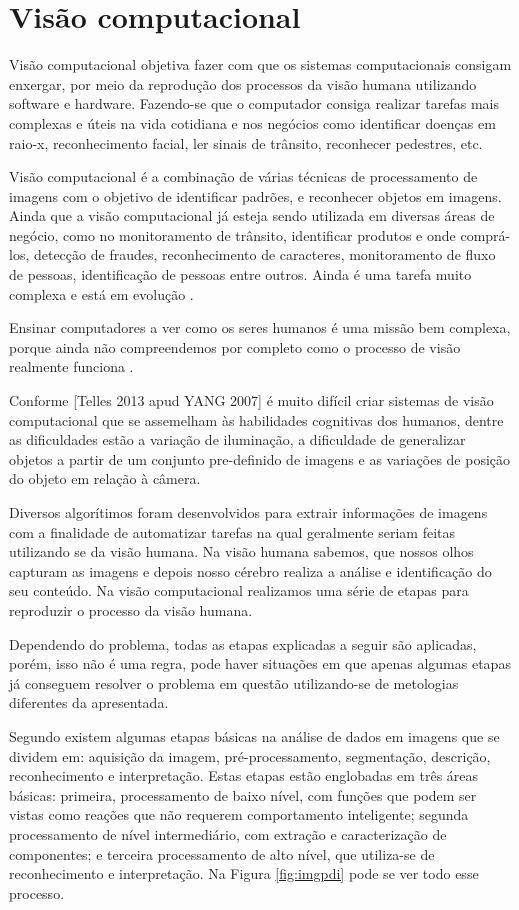 \section{Visão computacional}
\label{sec:vc}
Visão computacional objetiva fazer com que os sistemas computacionais consigam enxergar, por meio da reprodução dos processos da visão humana utilizando software e hardware. Fazendo-se que o computador consiga realizar tarefas mais complexas e úteis na vida cotidiana e nos negócios como identificar doenças em raio-x, reconhecimento facial, ler sinais de trânsito, reconhecer pedestres, etc. \cite{dsAcademy2017}

Visão computacional é a combinação de várias técnicas de processamento de imagens  com o objetivo de identificar padrões, e reconhecer objetos em imagens. Ainda que a visão computacional já esteja sendo utilizada em diversas áreas de negócio, como no monitoramento de trânsito, identificar produtos e onde comprá-los, detecção de fraudes, reconhecimento de caracteres, monitoramento de fluxo de pessoas, identificação de pessoas entre outros. Ainda é uma tarefa muito complexa e está em evolução \cite{dsAcademy2017}.


Ensinar computadores a ver como os seres humanos é uma missão bem complexa, porque ainda não compreendemos por completo como o processo de visão realmente funciona \cite{dsAcademy2017}.

Conforme [Telles 2013 apud YANG 2007] é muito difícil criar sistemas de visão computacional que se assemelham  às  habilidades cognitivas dos  humanos, dentre as dificuldades estão a variação de iluminação, a dificuldade de generalizar objetos a partir de um conjunto pre-definido de imagens e as variações de posição do objeto em relação à câmera.

Diversos algorítimos foram desenvolvidos para extrair informações de imagens com a finalidade de automatizar tarefas na qual geralmente seriam feitas utilizando se da visão humana. Na visão humana  sabemos,  que  nossos olhos capturam as imagens e depois nosso cérebro realiza a análise e identificação do seu conteúdo. Na visão computacional realizamos uma série de etapas para reproduzir o processo da visão humana.

Dependendo do problema, todas as etapas explicadas a seguir são aplicadas, porém, isso não é uma regra, pode haver situações em que apenas algumas etapas já conseguem resolver o problema em questão utilizando-se de metologias diferentes  da apresentada.

Segundo \cite{digitalImgProcess2010} existem algumas etapas básicas na análise de dados em imagens que se dividem em: aquisição da imagem, pré-processamento, segmentação, descrição, reconhecimento e interpretação. Estas etapas estão englobadas em três áreas básicas: primeira, processamento de baixo nível, com funções que podem ser vistas como reações que não requerem comportamento inteligente; segunda processamento de nível intermediário, com extração e caracterização de componentes; e terceira processamento de alto nível, que utiliza-se de reconhecimento e interpretação. Na Figura \ref{fig:imgpdi} pode se ver todo esse processo.

